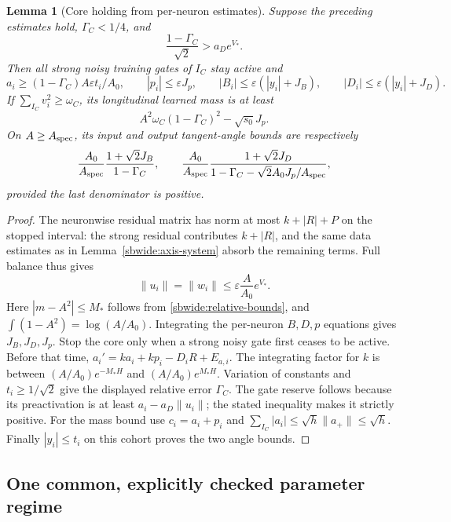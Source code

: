 \documentclass[11pt]{article}
\newtheorem{lemma}[theorem]{Lemma}
\theoremstyle{remark}
\begin{document}
\begin{lemma}[Core holding from per-neuron estimates]
\label{sbwide:core-holding}
Suppose the preceding estimates hold, $\Gamma_C<1/4$, and
\[
 \frac{1-\Gamma_C}{\sqrt2}>a_De^{V_*}.
\]
Then all strong noisy training gates of $I_C$ stay active and
\[
 a_i\ge(1-\Gamma_C)A\varepsilon t_i/A_0,\qquad
 |p_i|\le\varepsilon J_p,\qquad
 |B_i|\le\varepsilon(|y_i|+J_B),\qquad
 |D_i|\le\varepsilon(|y_i|+J_D).
\]
If $\sum_{I_C}v_i^2\ge\omega_C$, its longitudinal learned mass is at least
\begin{equation}\label{sbwide:core-mass}
 A^2\omega_C(1-\Gamma_C)^2-\sqrt{s_0}J_p.
\end{equation}
On $A\ge A_{\rm spec}$, its input and output tangent-angle bounds are
respectively
\[
 \frac{A_0}{A_{\rm spec}}
 \frac{1+\sqrt2J_B}{1-\Gamma_C},\qquad
 \frac{A_0}{A_{\rm spec}}
 \frac{1+\sqrt2J_D}
 {1-\Gamma_C-\sqrt2 A_0J_p/A_{\rm spec}},
\]
provided the last denominator is positive.
\end{lemma}
\begin{proof}
The neuronwise residual matrix has norm at most
$k+|R|+P$ on the stopped interval: the strong residual contributes
$k+|R|$, and the same data estimates as in
Lemma~\ref{sbwide:axis-system} absorb the remaining terms.
Full balance thus gives
\[
 \|u_i\|=\|w_i\|\le\varepsilon\frac A{A_0}e^{V_*}.
\]
Here $|m-A^2|\le M_*$ follows from \eqref{sbwide:relative-bounds},
and $\int(1-A^2)=\log(A/A_0)$.
Integrating the per-neuron $B,D,p$ equations gives $J_B,J_D,J_p$.
Stop the core only when a strong noisy gate first ceases to be active.
Before that time,
$a_i'=ka_i+kp_i-D_iR+E_{a,i}$.
The integrating factor for $k$ is between
$(A/A_0)e^{-M_*H}$ and $(A/A_0)e^{M_*H}$.
Variation of constants and $t_i\ge1/\sqrt2$ give the displayed
relative error $\Gamma_C$.
The gate reserve follows because its preactivation is at least
$a_i-a_D\|u_i\|$; the stated inequality makes it strictly positive.
For the mass bound use $c_i=a_i+p_i$ and
$\sum_{I_C}|a_i|\le\sqrt h\|a_+\|\le\sqrt h$.
Finally $|y_i|\le t_i$ on this cohort proves the two angle bounds.
\end{proof}

\subsection{One common, explicitly checked parameter regime}
\end{document}
